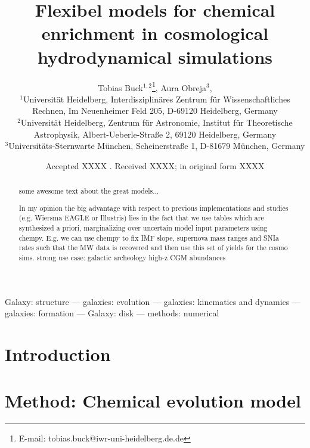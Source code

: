 \documentclass[useAMS,usenatbib]{mnras}
\title[SSP models for chemical enrichment]{Flexibel models for chemical enrichment in cosmological hydrodynamical simulations}
\author[T. Buck] {Tobias Buck$^{1,2}$\thanks{E-mail: tobias.buck@iwr-uni-heidelberg.de.de}, Aura Obreja$^{3}$, \etal \\  %
%
$^1$Universit\"at Heidelberg, Interdisziplin\"ares Zentrum f\"ur Wissenschaftliches Rechnen, Im Neuenheimer Feld 205, D-69120 Heidelberg, Germany\\
$^2$Universit\"at Heidelberg, Zentrum f\"ur Astronomie, Institut f\"ur Theoretische Astrophysik, Albert-Ueberle-Straße 2, 69120 Heidelberg, Germany\\
$^3$Universit\"ats-Sternwarte M\"unchen, Scheinerstraße 1, D-81679 M\"unchen, Germany%
}
\begin{document}
\date{Accepted XXXX . Received XXXX; in original form XXXX}

\pagerange{\pageref{firstpage}--\pageref{lastpage}} 

\maketitle

\label{firstpage}


\begin{abstract}
some awesome text about the great models...

In my opinion the big advantage with respect to previous implementations and studies (e.g. Wiersma EAGLE or Illustris) lies in the fact that we use tables which are synthesized a priori, marginalizing over uncertain model input parameters using chempy. E.g. we can use chempy to fix IMF slope, supernova mass ranges and SNIa rates such that the MW data is recovered and then use this set of yields for the cosmo sims.
strong use case: 
galactic archeology
high-z CGM abundances
\end{abstract}

\noindent
\begin{keywords}

Galaxy: structure --- galaxies:
  evolution --- galaxies: kinematics and dynamics --- galaxies:
  formation --- Galaxy: disk --- methods: numerical
 \end{keywords}



\section{Introduction} \label{sec:introduction}



\section{Method: Chemical evolution model} \label{sec:simulation}
\end{document}
